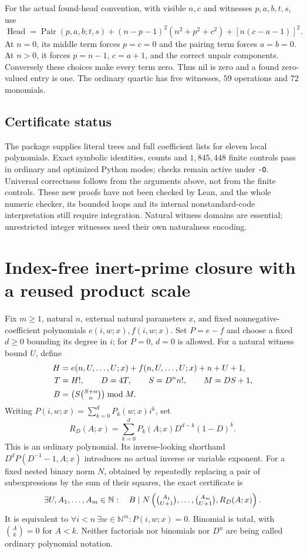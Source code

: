 For the actual found-head convention, with visible $n,c$ and witnesses
$p,a,b,t,s$, use
\[
 \operatorname{Head}=\operatorname{Pair}(p,a,b;t,s)
 +(n-p-1)^2(n^2+p^2+c^2)+[n(c-a-1)]^2.
\]
At $n=0$, its middle term forces $p=c=0$ and the pairing term forces
$a=b=0$.  At $n>0$, it forces $p=n-1$, $c=a+1$, and the correct unpair
components.  Conversely these choices make every term zero.  Thus nil is
zero and a found zero-valued entry is one.  The ordinary quartic has five
witnesses, $59$ operations and $72$ monomials.

\subsection{Certificate status}
The package supplies literal trees and full coefficient lists for eleven
local polynomials.  Exact symbolic identities, counts and $1{,}845{,}448$
finite controls pass in ordinary and optimized Python modes; checks remain
active under \texttt{-O}.  Universal correctness follows from the arguments
above, not from the finite controls.  These new proofs have not been checked
by Lean, and the whole numeric checker, its bounded loops and its internal
nonstandard-code interpretation still require integration.  Natural witness
domains are essential; unrestricted integer witnesses need their own
naturalness encoding.

\section{Index-free inert-prime closure with a reused product scale}
\label{sec:index-free-crt-wave11}

Fix $m\ge1$, natural $n$, external natural parameters $x$, and fixed
nonnegative-coefficient polynomials $e(i,w;x),f(i,w;x)$.  Set $P=e-f$ and
choose a fixed $d\ge0$ bounding its degree in $i$; for $P=0$, $d=0$ is
allowed.  For a natural witness bound $U$, define
\[
\begin{split}
 H&=e(n,U,\ldots,U;x)+f(n,U,\ldots,U;x)+n+U+1,\\
 T&=H!,\qquad D=4T,\qquad S=D^n n!,\qquad M=DS+1,\\
 B&=\bigl(S\tbinom{S+n}{n}\bigr)\bmod M.
\end{split}
\]
Writing $P(i,w;x)=\sum_{k=0}^dP_k(w;x)i^k$, set
\[
 R_D(A;x)=\sum_{k=0}^dP_k(A;x)D^{d-k}(1-D)^k.
\]
This is an ordinary polynomial.  Its inverse-looking shorthand
$D^dP(D^{-1}-1,A;x)$ introduces no actual inverse or variable exponent.
For a fixed nested binary norm $N$, obtained by repeatedly replacing a pair
of subexpressions by the sum of their squares, the exact certificate is
\[
 \exists U,A_1,\ldots,A_m\in\mathbb N:\quad
 B\mid N\left(\tbinom{A_1}{U+1},\ldots,
                 \tbinom{A_m}{U+1},R_D(A;x)\right).
\]
It is equivalent to $\forall i<n\ \exists w\in\mathbb N^m:P(i,w;x)=0$.
Binomial is total, with $\binom Ak=0$ for $A<k$.  Neither factorials nor
binomials nor $D^n$ are being called ordinary polynomial notation.

